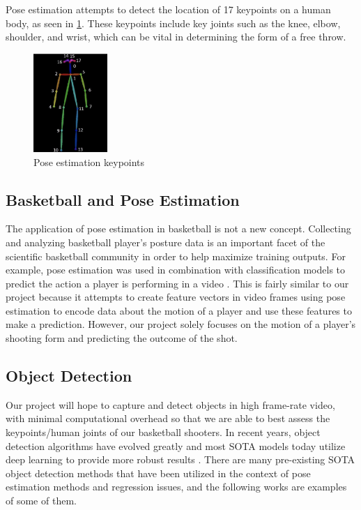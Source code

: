 \documentclass[10pt,twocolumn,letterpaper]{article}
\begin{document}
Pose estimation attempts to detect the location of 17 keypoints on a human body, as seen in \ref{fig:pose}. These keypoints include key joints such as
the knee, elbow, shoulder, and wrist, which can be vital in determining the form of a free throw.
\begin{figure}[h]
  \centering
  \includegraphics[width=0.25\textwidth]{imgs/openpose.png}
  \caption{Pose estimation keypoints}
  \label{fig:pose}
\end{figure}
%
 
\subsection{Basketball and Pose Estimation}

The application of pose estimation in basketball is not a new concept. Collecting and analyzing basketball player's
posture data is an important facet of the scientific basketball community in order to help maximize training outputs.
For example, pose estimation was used in combination with classification models to predict the action a player is performing
in a video \cite{Basketball}. This is fairly similar to our project because it attempts to create feature vectors in video frames
using pose estimation to encode data about the motion of a player and use these features to make a prediction. However, our project
solely focuses on the motion of a player's shooting form and predicting the outcome of the shot.

%

\subsection{Object Detection}

Our project will hope to capture and detect objects in high frame-rate video, with minimal computational overhead so that we are able to best assess the keypoints/human joints of our basketball shooters. 
In recent years, object detection algorithms have evolved greatly and most SOTA models today utilize deep learning to provide more robust results \cite{Viso}. There are many pre-existing SOTA object detection methods that have been utilized in the context of pose estimation methods and regression issues, and the following works are examples of some of them.
\end{document}

